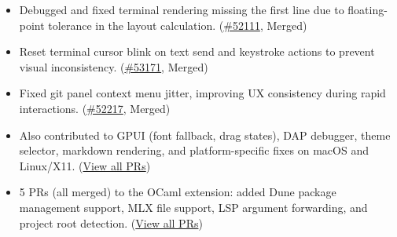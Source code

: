 \documentclass[10pt,a4paper]{article}
\begin{document}
\begin{itemize}
    \item {\footnotesize Debugged and fixed terminal rendering missing the first line due to floating-point tolerance in the layout calculation. (\href{https://github.com/zed-industries/zed/pull/52111}{\#52111}, Merged)}
    \item {\footnotesize Reset terminal cursor blink on text send and keystroke actions to prevent visual inconsistency. (\href{https://github.com/zed-industries/zed/pull/53171}{\#53171}, Merged)}
    \item {\footnotesize Fixed git panel context menu jitter, improving UX consistency during rapid interactions. (\href{https://github.com/zed-industries/zed/pull/52217}{\#52217}, Merged)}
    \item {\footnotesize Also contributed to GPUI (font fallback, drag states), DAP debugger, theme selector, markdown rendering, and platform-specific fixes on macOS and Linux/X11. (\href{https://github.com/zed-industries/zed/pulls?q=author\%3ADnreikronos}{View all PRs})}
    \item {\footnotesize 5 PRs (all merged) to the OCaml extension: added Dune package management support, MLX file support, LSP argument forwarding, and project root detection. (\href{https://github.com/zed-extensions/ocaml/pulls?q=author\%3ADnreikronos}{View all PRs})}
\end{itemize}
\end{document}
